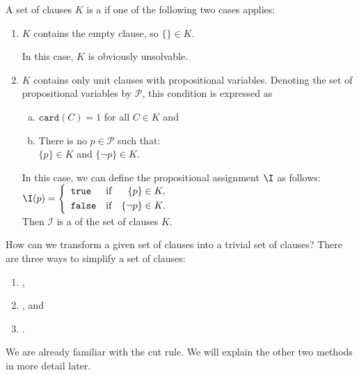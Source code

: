 \begin{Definition}
  A set of clauses $K$ is a  if one of the following two cases applies:
  \begin{enumerate}
  \item $K$ contains the empty clause, so $\{\} \in K$.

        In this case, $K$ is obviously unsolvable.
  \item $K$ contains only unit clauses with \underline{} propositional variables.
        Denoting the set of propositional variables by $\mathcal{P}$,
        this condition is expressed as 
        \begin{enumerate}[(a)]
        \item $\texttt{card}(C) = 1$ \quad for all $C \in K$ \quad and
        \item There is no $p \in \mathcal{P}$ such that: 
              \\[0.2cm]
              \hspace*{1.3cm}
              $\{p\} \in K$ \quad and \quad $\{\neg p\} \in K$.
        \end{enumerate}
        In this case, we can define the propositional assignment $\I$ as follows:
        \\[0.2cm]
        \hspace*{1.3cm}
        $\I(p) = \left\{
                   \begin{array}{lcr}
                     \texttt{true}  & \mbox{if} & \{p\}      \in K, \\[0.1cm]
                     \texttt{false} & \mbox{if} & \{\neg p\} \in K.
                   \end{array}
                 \right.
        $
        \\[0.2cm]
        Then $\mathcal{I}$ is a  of the set of clauses $K$. \eox
  \end{enumerate}
\end{Definition}

How can we transform a given set of clauses into a trivial set of clauses?
There are three ways to simplify a set of clauses:
\begin{enumerate}
\item {},
\item {}, and
\item {}.
\end{enumerate}
We are already familiar with the cut rule.  We will explain the other two methods in more detail later.

